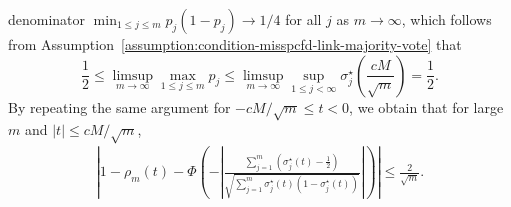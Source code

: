 \documentclass[11pt]{article}
\newcommand{\prn}[1]{\left({#1}\right)} %
\newcommand{\<}{\langle} %
\renewcommand{\>}{\rangle}
\newcommand{\half}{\frac{1}{2}}
\newcommand{\opt}{^\star}
\begin{document}
denominator $\min_{1 \leq j \leq m}p_j(1-p_j) \to 1/4$ for all $j$ as $m \to
\infty$, which follows from
Assumption~\ref{assumption:condition-misspcfd-link-majority-vote}
that
\begin{equation*}
  \half \leq \limsup_{m \to \infty} \max_{1 \leq j \leq m} p_j \leq \limsup_{m \to \infty} \sup_{1 \leq j < \infty} {\sigma_j\opt} \prn{\frac{cM}{\sqrt m} } =
  \half.
\end{equation*}
By repeating the same argument for $-cM /\sqrt m \leq t < 0$, we obtain that for large $m$ and $|t| \leq cM / \sqrt m$,
\begin{align}
  \left|1 - \rho_m(t) - \Phi \left(-\left|\frac{ \sum_{j=1}^m \left( \sigma_j\opt(t) - \half\right)}{\sqrt{\sum_{j=1}^m \sigma_j\opt(t) \prn{1 - \sigma_j\opt(t)}}}\right|\right)\right| \leq \frac{2}{\sqrt m}   . \label{eq:BE-approximation}
\end{align}
\end{document}
